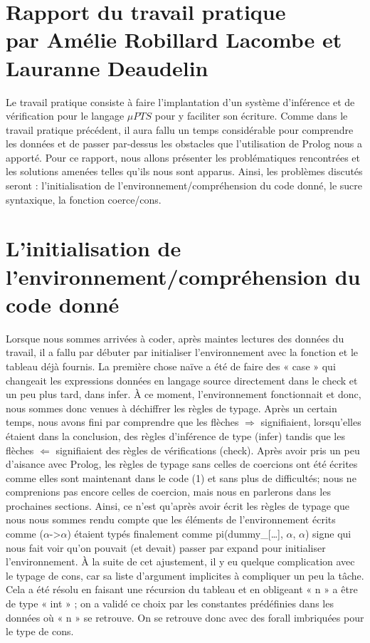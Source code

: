 \documentclass[12pt,a4paper]{article}
\begin{document}
\section*{Rapport du travail pratique\\ \small par Amélie Robillard Lacombe et Lauranne Deaudelin}

Le travail pratique consiste à faire l'implantation d'un système d'inférence et de vérification pour le langage $\mu PTS$ pour y faciliter son écriture. Comme dans le travail pratique précédent, il aura fallu un temps considérable pour comprendre les données et de passer par-dessus les obstacles que l’utilisation de Prolog nous a apporté.  Pour ce rapport, nous allons présenter les problématiques rencontrées et les solutions amenées telles qu’ils nous sont apparus. Ainsi, les problèmes discutés seront : l’initialisation de l’environnement/compréhension du code donné, le sucre syntaxique, la fonction coerce/cons.
\section*{ L’initialisation de l’environnement/compréhension du code donné }
Lorsque nous sommes arrivées à coder, après maintes lectures des données du travail, il a fallu par débuter par initialiser l’environnement avec la fonction et le tableau déjà fournis. La première chose naïve a été de faire des « case » qui changeait les expressions données en langage source directement dans le check et un peu plus tard, dans infer. À ce moment, l’environnement fonctionnait et donc, nous sommes donc venues à déchiffrer les règles de typage. Après un certain temps, nous avons fini par comprendre que les flèches $\Rightarrow$ signifiaient, lorsqu’elles étaient dans la conclusion, des règles d’inférence de type (infer) tandis que les flèches $\Leftarrow$ signifiaient des règles de vérifications (check). Après avoir pris un peu d’aisance avec Prolog, les règles de typage sans celles de coercions ont été écrites comme elles sont maintenant dans le code (1) et sans plus de difficultés; nous ne comprenions pas encore celles de coercion, mais nous en parlerons dans les prochaines sections. Ainsi, ce n’est qu’après avoir écrit les règles de typage que nous nous sommes rendu compte que les éléments de l’environnement écrits comme ($\alpha$->$\alpha$) étaient typés finalement comme pi(dummy\_[…], $\alpha$, $\alpha$) signe qui nous fait voir qu’on pouvait (et devait) passer par expand pour initialiser l’environnement.  À la suite de cet ajustement, il y eu quelque complication avec le typage de cons, car sa liste d’argument implicites à compliquer un peu la tâche. Cela a été résolu en faisant une récursion du tableau et en obligeant « n » a être de type « int » ; on a validé ce choix par les constantes prédéfinies dans les données où « n » se retrouve. On se retrouve donc avec des forall imbriquées pour le type de cons.
\end{document}
